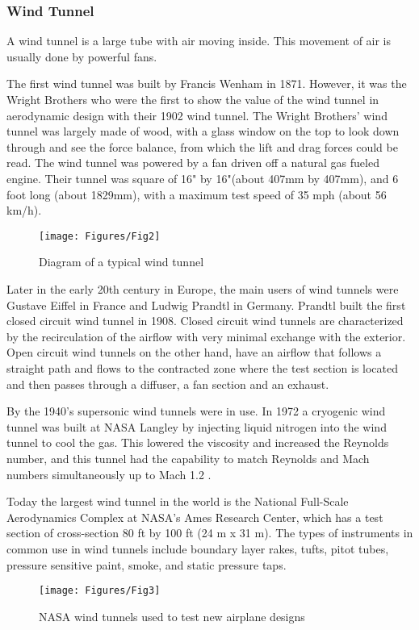 \subsubsection{Wind Tunnel}
A wind tunnel is a large tube with air moving inside. This movement of air is usually done by powerful fans. 

The first wind tunnel was built by Francis Wenham in 1871. However, it was the Wright Brothers who were the first to show the value of the wind tunnel in aerodynamic design with their 1902 wind tunnel.  The Wright Brothers’ wind tunnel was largely made of wood, with a glass window on the top to look down through and see the force balance, from which the
lift and drag forces could be read. The wind tunnel was powered by a fan driven off a natural gas fueled engine. Their tunnel was square of 16" by 16"(about 407mm by 407mm), and 6 foot long (about 1829mm), with a maximum test speed of 35 mph (about 56 km/h).
\begin{center}
	\begin{figure}[!h]
	\centering
	\texttt{[image: Figures/Fig2]}
	\caption{Diagram of a typical wind tunnel}
	\end{figure}
\end{center}

Later in the early 20th century in Europe, the main users of wind tunnels were Gustave Eiffel in France and Ludwig Prandtl in Germany. Prandtl built the first closed circuit wind tunnel in 1908. Closed circuit wind tunnels are characterized by the recirculation of the airflow with very minimal exchange with the exterior. Open circuit wind tunnels on the other hand, have an airflow that follows a straight path and flows to the contracted zone where the test section is located and then passes through a diffuser, a fan section and an exhaust.

By the 1940’s supersonic wind tunnels were in use. In 1972 a cryogenic wind tunnel was built at NASA Langley by injecting liquid nitrogen into the wind tunnel to cool the gas. This lowered the viscosity and increased the Reynolds number, and this tunnel had the capability to match Reynolds and Mach numbers simultaneously up to Mach 1.2
\cite{fernandes_design_nodate}.

Today the largest wind tunnel in the world is the National Full-Scale Aerodynamics Complex at NASA's Ames Research Center, which has a test section of cross-section 80 ft by 100 ft (24 m x 31 m). The types of instruments in common use in wind tunnels include boundary layer rakes, tufts, pitot tubes, pressure sensitive paint, smoke, and static pressure taps.
\begin{center}
\begin{figure}[!h]
	\centering
	\texttt{[image: Figures/Fig3]}
	\caption{NASA wind tunnels used to test new airplane designs}
\end{figure}
\end{center}


